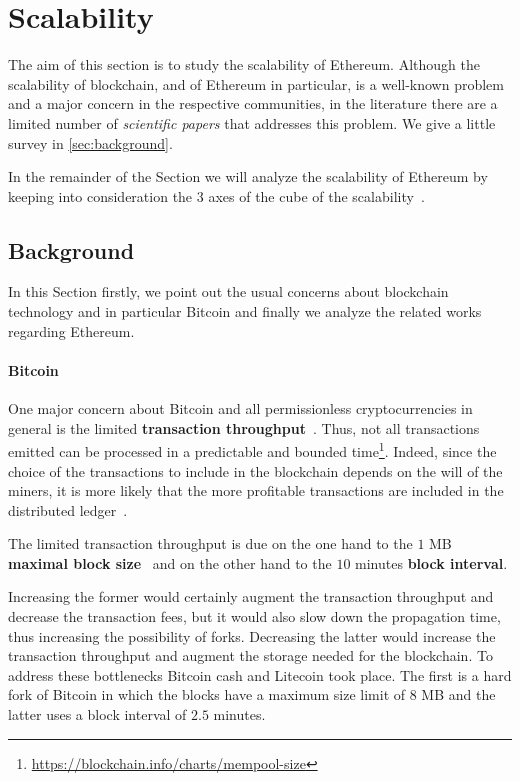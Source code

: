\section{Scalability}
\label{sec:scalability}
The aim of this section is to study the scalability of Ethereum.
Although the scalability of blockchain, and of Ethereum in particular, is a
well-known problem and a major concern in the respective communities, in the
literature there are a limited number of \emph{scientific papers} that
addresses this problem.
We give a little survey in \autoref{sec:background}.

In the remainder of the Section we will analyze the scalability of Ethereum by
keeping into consideration the 3 axes of the cube of the
scalability~\cite{bib:art-of-scalability}.


\subsection{Background}

In this Section firstly, we point out the usual concerns about blockchain
technology and in particular Bitcoin and finally we analyze the related works
regarding Ethereum.

\paragraph{Bitcoin} 
One major concern about Bitcoin and all permissionless cryptocurrencies
in general is the limited \textbf{transaction
throughput}~\cite{bib:blockchain-challenges-opportunites-survey, bib:taxonomy}.
Thus, not all transactions emitted can be processed in a
predictable and bounded
time\footnote{\url{https://blockchain.info/charts/mempool-size}}.
Indeed, since the choice of the transactions
to include in the blockchain depends on the will of the miners,
it is more likely that the more profitable transactions are included
in the distributed
ledger~\cite{bib:blockchain-challenges-opportunites-survey,wood2018ethereum}.

The limited transaction throughput is due on the one hand to the
$1$ MB \textbf{maximal block size}~\cite{bib:masteringbitcoin} and on the other
hand to the $10$ minutes \textbf{block interval}.

Increasing the former would certainly augment the transaction throughput and
decrease the transaction fees, but it would also slow down the propagation
time, thus increasing the possibility of forks.
Decreasing the latter would increase the transaction throughput and augment
the storage needed for the blockchain.
To address these bottlenecks Bitcoin cash and Litecoin
took place. The first is a hard fork of Bitcoin in which 
the blocks have a maximum size limit of $8$ MB and the
latter uses a block interval of $2.5$ minutes.


